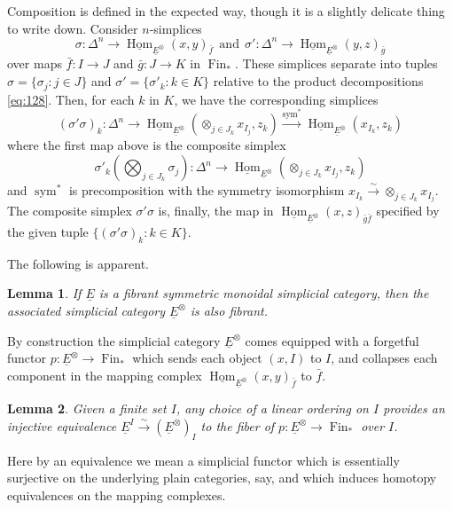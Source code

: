 \documentclass[reqno]{amsart}
\newtheorem{lemma}{Lemma}[section]
\theoremstyle{definition}
\newcommand{\opn}[1]{\operatorname{#1}}
\newcommand{\ot}{\otimes}
\newcommand{\uHom}{\underline{\operatorname{Hom}}}
\DeclareMathOperator{\Fin}{Fin}
\renewcommand{\1}{\mathbf{1}}
\begin{document}
Composition is defined in the expected way, though it is a slightly delicate thing to write down.  Consider $n$-simplices
\[
\sigma:\Delta^n\to \uHom_{\underline{E}^{\ot}}(x,y)_{\bar{f}}\ \ \text{and}\ \ \sigma':\Delta^n\to \uHom_{\underline{E}^{\ot}}(y,z)_{\bar{g}}
\]
over maps $\bar{f}:I\to J$ and $\bar{g}:J\to K$ in $\Fin_{\ast}$. These simplices separate into tuples $\sigma=\{\sigma_j:j\in J\}$ and $\sigma'=\{\sigma'_k:k\in K\}$ relative to the product decompositions \eqref{eq:128}.  Then, for each $k$ in $K$, we have the corresponding simplices
\begin{equation}\label{eq:composition}
(\sigma'\sigma)_k:\Delta^n\to \uHom_{\underline{E}^{\ot}}(\otimes_{j\in J_k}x_{I_j},z_k)\overset{\opn{sym}^{\ast}}\longrightarrow \uHom_{\underline{E}^{\ot}}(x_{I_k},z_k)
\end{equation}
where the first map above is the composite simplex
\[
\sigma'_k(\bigotimes_{j\in J_k}\sigma_j):\Delta^n\to \uHom_{\underline{E}^{\ot}}(\otimes_{j\in J_k}x_{I_j},z_k)
\]
and $\opn{sym}^{\ast}$ is precomposition with the symmetry isomorphism $x_{I_k}\overset{\sim}\to \otimes_{j\in J_k}x_{I_j}$.  The composite simplex $\sigma'\sigma$ is, finally, the map in $\uHom_{\underline{E}^{\ot}}(x,z)_{\bar{g}\bar{f}}$ specified by the given tuple $\{(\sigma'\sigma)_k:k\in K\}$.
\par

The following is apparent.

\begin{lemma}
If $\underline{E}$ is a fibrant symmetric monoidal simplicial category, then the associated simplicial category $\underline{E}^{\ot}$ is also fibrant.
\end{lemma}

By construction the simplicial category $\underline{E}^{\ot}$ comes equipped with a forgetful functor $p:\underline{E}^{\ot}\to \Fin_{\ast}$ which sends each object $(x,I)$ to $I$, and collapses each component in the mapping complex $\uHom_{\underline{E}^{\ot}}(x,y)_{\bar{f}}$ to $\bar{f}$.

\begin{lemma}\label{lem:466}
Given a finite set $I$, any choice of a linear ordering on $I$ provides an injective equivalence $\underline{E}^I\overset{\sim}\to (\underline{E}^{\ot})_I$ to the fiber of $p:\underline{E}^{\ot}\to \Fin_{\ast}$ over $I$.
\end{lemma}

Here by an equivalence we mean a simplicial functor which is essentially surjective on the underlying plain categories, say, and which induces homotopy equivalences on the mapping complexes.
\end{document}
